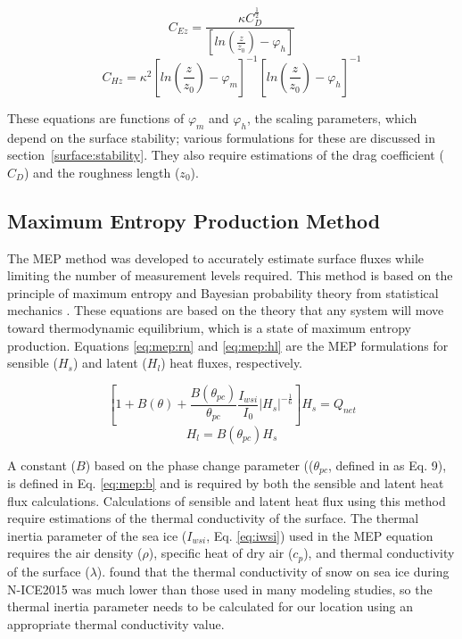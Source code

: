 \begin{equation}\label{eq:cez}
C_{Ez} = \frac{\kappa C_{D}^{\frac{1}{2}}}{[ln(\frac{z}{z_{0}})-\varphi_{h}]}
\end{equation}
\begin{equation}\label{eq:chz}
C_{Hz} =  \kappa^{2} \left[ ln \left( \frac{z}{z_{0}} \right) - \varphi_{m} \right] ^{-1} \left[ ln \left( \frac{z}{z_{0}} \right) - \varphi_{h} \right] ^{-1}
\end{equation}

These equations are functions of $\varphi_{m}$ and $\varphi_{h}$, the scaling parameters, which depend on the surface stability; various formulations for these are discussed in section~\ref{surface:stability}. They also require estimations of the drag coefficient ($C_{D}$) and the roughness length ($z_{0}$).

\subsection{Maximum Entropy Production Method} 
The MEP method was developed to accurately estimate surface fluxes while limiting the number of measurement levels required. This method is based on the principle of maximum entropy and Bayesian probability theory from statistical mechanics \citep{wang:2014}. These equations are based on the theory that any system will move toward thermodynamic equilibrium, which is a state of maximum entropy production. Equations \ref{eq:mep:rn} and \ref{eq:mep:hl}  are the MEP formulations for sensible ($H_{s}$) and latent ($H_{l}$) heat fluxes, respectively. 

\begin{equation}\label{eq:mep:rn}
\left[ 1 + B(\theta) + \frac{B(\theta_{pc})}{\theta_{pc}} \frac{I_{wsi}}{I_{0}} | H_{s} | ^{-\frac{1}{6}} \right] H_{s} = Q_{net}
\end{equation}
\begin{equation}\label{eq:mep:hl}
H_{l} = B(\theta_{pc}) H_{s}
\end{equation}

A constant ($B$) based on the phase change parameter (($\theta_{pc}$, defined in \citep{wang:2011} as Eq. 9), is defined in Eq. \ref{eq:mep:b} and is required by both the sensible and latent heat flux calculations. Calculations of sensible and latent heat flux using this method require estimations of the thermal conductivity \citep{wang:2014} of the surface. The thermal inertia parameter of the sea ice ($I_{wsi}$, Eq. \ref{eq:iwsi}) used in the MEP equation requires the air density ($\rho$), specific heat of dry air ($c_{p}$), and thermal conductivity of the surface ($\lambda$). \citet{merkouriadi:2017} found that the thermal conductivity of snow on sea ice during N-ICE2015 was much lower than those used in many modeling studies, so the thermal inertia parameter needs to be calculated for our location using an appropriate thermal conductivity value. 

